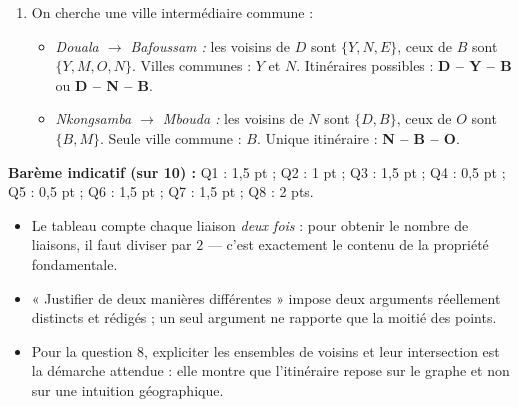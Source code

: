 \documentclass[11pt]{article}
\begin{document}
\begin{corrige}
\begin{enumerate}
\item On cherche une ville intermédiaire commune :
\begin{itemize}
\item \emph{Douala $\to$ Bafoussam :} les voisins de $D$ sont $\{Y, N, E\}$, ceux de $B$ sont $\{Y, M, O, N\}$. Villes communes : $Y$ et $N$. Itinéraires possibles : \textbf{D -- Y -- B} ou \textbf{D -- N -- B}.
\item \emph{Nkongsamba $\to$ Mbouda :} les voisins de $N$ sont $\{D, B\}$, ceux de $O$ sont $\{B, M\}$. Seule ville commune : $B$. Unique itinéraire : \textbf{N -- B -- O}.
\end{itemize}
\end{enumerate}
\textbf{Barème indicatif (sur 10) :} Q1 : 1,5 pt ; Q2 : 1 pt ; Q3 : 1,5 pt ; Q4 : 0,5 pt ; Q5 : 0,5 pt ; Q6 : 1,5 pt ; Q7 : 1,5 pt ; Q8 : 2 pts.
\end{corrige}

\begin{attention}
\begin{itemize}
\item Le tableau compte chaque liaison \emph{deux fois} : pour obtenir le nombre de liaisons, il faut diviser par $2$ --- c'est exactement le contenu de la propriété fondamentale.
\item « Justifier de deux manières différentes » impose deux arguments réellement distincts et rédigés ; un seul argument ne rapporte que la moitié des points.
\item Pour la question 8, expliciter les ensembles de voisins et leur intersection est la démarche attendue : elle montre que l'itinéraire repose sur le graphe et non sur une intuition géographique.
\end{itemize}
\end{attention}
\end{document}
